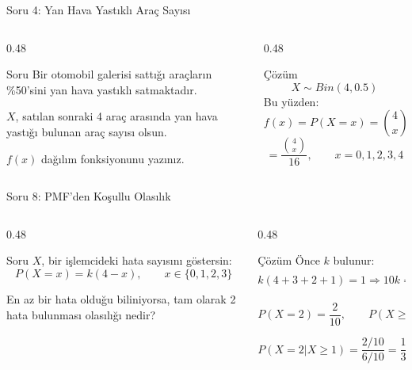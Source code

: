 \documentclass[light]{lutbeamer}
\begin{document}
\begin{frame}{Soru 4: Yan Hava Yastıklı Araç Sayısı}
\scriptsize
\begin{columns}[T,onlytextwidth]
    \begin{column}{0.48\textwidth}
        \begin{block}{Soru}
            Bir otomobil galerisi sattığı araçların \%50'sini yan hava yastıklı satmaktadır.

            \vspace{0.15cm}
            $X$, satılan sonraki 4 araç arasında yan hava yastığı bulunan araç sayısı olsun.

            \vspace{0.15cm}
            $f(x)$ dağılım fonksiyonunu yazınız.
        \end{block}
    \end{column}
    \begin{column}{0.48\textwidth}
        \begin{exampleblock}{Çözüm}
            \[
            X \sim Bin(4,0.5)
            \]
            Bu yüzden:
            \[
            f(x)=P(X=x)=\binom{4}{x}(0.5)^x(0.5)^{4-x}
            \]
            \[
            =\frac{\binom{4}{x}}{16},
            \qquad x=0,1,2,3,4
            \]
        \end{exampleblock}
    \end{column}
\end{columns}
\end{frame}

\begin{frame}{Soru 8: PMF'den Koşullu Olasılık}
\scriptsize
\begin{columns}[T,onlytextwidth]
    \begin{column}{0.48\textwidth}
        \begin{block}{Soru}
            $X$, bir işlemcideki hata sayısını göstersin:
            \[
            P(X=x)=k(4-x), \qquad x\in\{0,1,2,3\}
            \]

            \vspace{0.15cm}
            En az bir hata olduğu biliniyorsa, tam olarak 2 hata bulunması olasılığı nedir?
        \end{block}
    \end{column}
    \begin{column}{0.48\textwidth}
        \begin{exampleblock}{Çözüm}
            Önce $k$ bulunur:
            \[
            k(4+3+2+1)=1 \Rightarrow 10k=1 \Rightarrow k=\frac{1}{10}
            \]

            \[
            P(X=2)=\frac{2}{10}, \qquad P(X \ge 1)=1-\frac{4}{10}=\frac{6}{10}
            \]

            \[
            P(X=2|X \ge 1)=\frac{2/10}{6/10}=\frac{1}{3}
            \]
        \end{exampleblock}
    \end{column}
\end{columns}
\end{frame}
\end{document}
